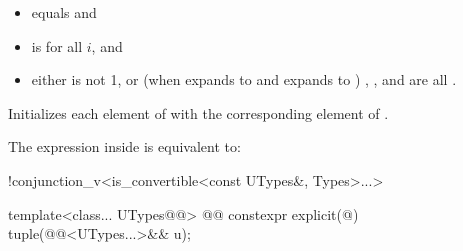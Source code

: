 \documentclass{wg21}
\begin{document}
\begin{itemdescr}
    \pnum
    \constraints
    \begin{itemize}
        \item
         equals  and
        
        \item
         is  for all $i$, and
        
        \item
        either
         is not 1, or
        (when  expands to  and  expands to )
        , , and  are all .
    \end{itemize}
    
    \pnum
    \effects
    Initializes each element of 
    with the corresponding element of .
    
    \pnum
    \remarks
    The expression inside  is equivalent to:
    \begin{codeblock}
        !conjunction_v<is_convertible<const UTypes&, Types>...>
    \end{codeblock}
\end{itemdescr}

%
\begin{itemdecl}
template<class... UTypes@@> 
@@
constexpr explicit(@\seebelow@) tuple(@@<UTypes...>&& u);
\end{itemdecl}
\end{document}
